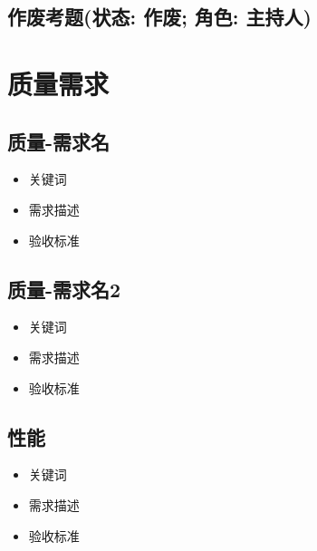 \documentclass[hyperref, a4paper]{ctexart}
\providecommand{\tightlist}{%
  \setlength{\itemsep}{0pt}\setlength{\parskip}{0pt}}
\begin{document}
\hypertarget{ux4f5cux5e9fux8003ux9898ux72b6ux6001-ux4f5cux5e9f-ux89d2ux8272-ux4e3bux6301ux4eba}{%
\subsection{作废考题(状态: 作废; 角色:
主持人)}\label{ux4f5cux5e9fux8003ux9898ux72b6ux6001-ux4f5cux5e9f-ux89d2ux8272-ux4e3bux6301ux4eba}}

\hypertarget{ux8d28ux91cfux9700ux6c42}{%
\section{质量需求}\label{ux8d28ux91cfux9700ux6c42}}

\hypertarget{ux8d28ux91cf-ux9700ux6c42ux540d}{%
\subsection{质量-需求名}\label{ux8d28ux91cf-ux9700ux6c42ux540d}}

\begin{itemize}
\tightlist
\item
  关键词
\item
  需求描述
\item
  验收标准
\end{itemize}

\hypertarget{ux8d28ux91cf-ux9700ux6c42ux540d2}{%
\subsection{质量-需求名2}\label{ux8d28ux91cf-ux9700ux6c42ux540d2}}

\begin{itemize}
\tightlist
\item
  关键词
\item
  需求描述
\item
  验收标准
\end{itemize}

\hypertarget{ux6027ux80fd}{%
\subsection{性能}\label{ux6027ux80fd}}

\begin{itemize}
\tightlist
\item
  关键词
\item
  需求描述
\item
  验收标准
\end{itemize}
\end{document}
